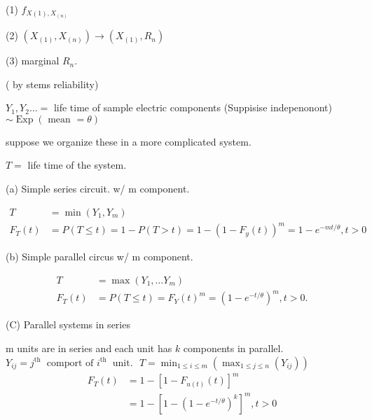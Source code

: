 \documentclass[10pt]{article}
\begin{document}
(1) $f_{X(1), X_{(n)}}$

(2) $\left(X_{(1)}, X_{(n)}\right) \rightarrow\left(X_{(1)}, R_{n}\right)$

(3) marginal $R_{n}$.

\begin{example}
    ( by stems reliability)

$Y_{1}, Y_{2} \ldots=$ life time of sample electric components (Suppisise indepenonont) 
$
\sim \operatorname{Exp}(\text { mean }=\theta)
$
\end{example} 


suppose we organize these in a more complicated system.

$T=$ life time of the system.

(a) Simple series circuit. w/ m component.

$$
\begin{aligned}
T & =\min \left(Y_{1}, Y_{m}\right) \\
F_{T}(t) & =P(T \leq t)=1-P(T>t)=1-\left(1-F_{y}(t)\right)^{m}=1-e^{-m t / \theta}, t >0
\end{aligned}
$$

(b) Simple parallel circus w/ m component.

$$
\begin{aligned}
T & =\max \left(Y_{1}, \ldots Y_{m}\right) \\
F_{T}(t) & =P(T \leq t)=F_{Y}(t)^{m}=\left(1-e^{-t / \theta}\right)^{m}, t>0 .
\end{aligned}
$$

(C) Parallel systems in series

m units are in series and each unit has $k$ components in parallel.
$ Y_{i j}=j^{\text {th }} \text { comport of } i^{\text {th }} \text { unit. }$
$ T=\min _{1 \leq i \leq m}\left(\max _{1 \leq j \leq n}\left(Y_{i j}\right)\right) 
$
$$
\begin{aligned}
F_{T}(t)&= 1-\left[1-F_{u(t)}(t)\right]^{m} \\
&=1-\left[1-\left(1-e^{-t / \theta}\right)^{k}\right]^{m}, t>0
\end{aligned}
$$
\end{document}

